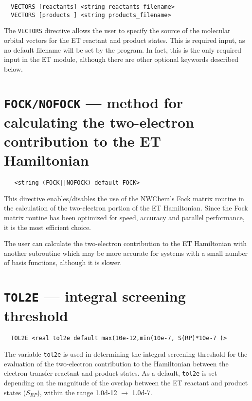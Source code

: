 \begin{verbatim}
  VECTORS [reactants] <string reactants_filename>
  VECTORS [products ] <string products_filename>
\end{verbatim}

The \verb+VECTORS+ directive allows the user to specify the source 
of the molecular orbital vectors for the ET reactant and product states. 
This is required input, as no default filename will be set by the program.
In fact, this is the only required input in the ET module, although there are
other optional keywords described below.



\section{{\tt FOCK/NOFOCK} --- method for calculating the two-electron contribution to the ET Hamiltonian}
\label{sec:fock}

 \begin{verbatim}
   <string (FOCK||NOFOCK) default FOCK>
 \end{verbatim}

This directive enables/disables the use of the NWChem's Fock matrix 
routine in the calculation of the two-electron portion of the ET Hamiltonian.
Since the Fock matrix routine has been optimized for speed, accuracy and parallel performance,
it is the most efficient choice.

The user can calculate the two-electron contribution to the ET Hamiltonian
with another subroutine which may be more accurate for systems with a small
number of basis functions, although it is slower.

\section{{\tt TOL2E} --- integral screening threshold}
\label{sec:etranstol2e}

\begin{verbatim}
  TOL2E <real tol2e default max(10e-12,min(10e-7, S(RP)*10e-7 )> 
\end{verbatim}

The variable \verb+tol2e+ is used in determining the integral
screening threshold for the evaluation of the two-electron contribution to the Hamiltonian
between the electron transfer reactant and product states.
As a default, \verb+tol2e+ is set depending on the magnitude
of the overlap between the ET reactant and product states ($S_{RP}$), within the range 1.0d-12 $\rightarrow$ 1.0d-7.

